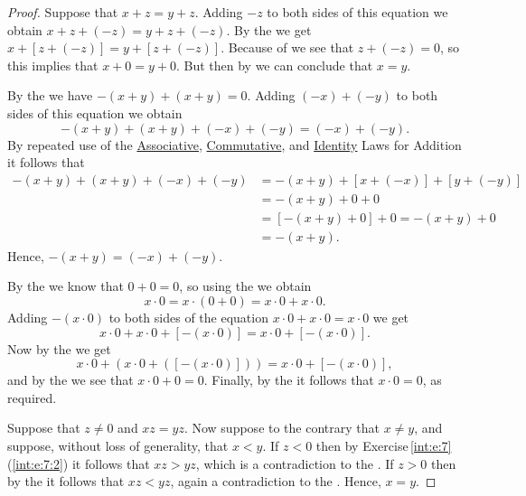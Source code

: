 \begin{proof}
	\hfill

	\label{int:e:11:1}
	Suppose that $x + z = y + z$. Adding $-z$ to both sides of this equation we obtain $x + z + (-z) = y + z + (-z)$. By the  we get $x + [z + (-z)] = y + [z + (-z)]$. Because of  we see that $z + (-z) = 0$, so this implies that $x + 0 = y + 0$. But then by  we can conclude that $x = y$.

	By the  we have $-(x + y) + (x + y) = 0$. Adding $(-x) + (-y)$ to both sides of this equation we obtain $$
		-(x + y) + (x + y) + (-x) + (-y) = (-x) + (-y).
	$$ By repeated use of the \hyperref[int:t:props:associative_add]{Associative}, \hyperref[int:t:props:commutative_add]{Commutative}, and \hyperref[int:t:props:identity_add]{Identity} Laws for Addition it follows that
	\begin{align*}
		-(x + y) + (x + y) + (-x) + (-y) & = -(x + y) + [x + (-x)] + [y + (-y)] \\
		                                 & = -(x + y) + 0 + 0                   \\
		                                 & = [-(x + y) + 0] + 0 = -(x + y) + 0  \\
		                                 & = -(x + y).
	\end{align*}
	Hence, $-(x + y) = (-x) + (-y)$.

	By the  we know that $0 + 0 = 0$, so using the  we obtain
	$$
		x \cdot 0 = x \cdot (0 + 0) = x \cdot 0 + x \cdot 0.
	$$
	Adding $-(x \cdot 0)$ to both sides of the equation $x \cdot 0 + x \cdot 0 = x \cdot 0$ we get
	$$
		x \cdot 0 + x \cdot 0 + [-(x \cdot 0)] = x \cdot 0 + [-(x \cdot 0)].
	$$
	Now by the  we get
	$$
		x \cdot 0 + (x \cdot 0 + ([-(x \cdot 0)])) = x \cdot 0 + [-(x \cdot 0)],
	$$
	and by the  we see that $x \cdot 0 + 0 = 0$. Finally, by the  it follows that $x \cdot 0 = 0$, as required.

	Suppose that $z \not= 0$ and $xz = yz$. Now suppose to the contrary that ${x \not= y}$, and suppose, without loss of generality, that $x < y$. If $z < 0$ then by Exercise\,\ref{int:e:7}\,(\ref{int:e:7:2}) it follows that $xz > yz$, which is a contradiction to the . If $z > 0$ then by the  it follows that $xz < yz$, again a contradiction to the . Hence, $x = y$.


\end{proof}
